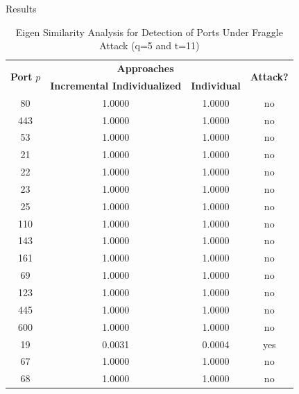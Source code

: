\documentclass[newPxFont, numfooter, sectionpages]{beamer}
\begin{document}
\begin{frame}{Results}
	
	\begin{table}[h!]
	  \centering
	  \tiny
	  \caption{Eigen Similarity Analysis for Detection of Ports Under Fraggle Attack (q=5 and t=11)}
	  \label{tab:tab10}
	  \begin{tabular}{ c c c c }
		\toprule
		\multirow{2}{*}{\textbf{Port} $p$}   &\multicolumn{2}{c}{\textbf{Approaches}} &\multirow{2}{*}{\textbf{Attack?}}\\ 
				\hhline{~--~}
				&\textbf{Incremental Individualized} &\textbf{Individual}\\
		\midrule
		80 &1.0000 &1.0000 &no \\
		443 &1.0000 &1.0000 &no \\
		53 &1.0000 &1.0000 &no \\
		21 &1.0000 &1.0000 &no \\
		22 &1.0000 &1.0000 &no \\
		23 &1.0000 &1.0000 &no \\
		25 &1.0000 &1.0000 &no \\
		110 &1.0000 &1.0000 &no \\
		143 &1.0000 &1.0000 &no \\
		161 &1.0000 &1.0000 &no \\
		69 &1.0000 &1.0000 &no \\
		123 &1.0000 &1.0000 &no \\
		445 &1.0000 &1.0000 &no \\
		600 &1.0000 &1.0000 &no \\
		19 &\color{red}0.0031 &\color{red}0.0004 &\color{red}yes \\
		67 &1.0000 &1.0000 &no \\
		68 &1.0000 &1.0000 &no \\
	    \bottomrule
	  \end{tabular}
	\end{table}
	
\end{frame}
\end{document}
